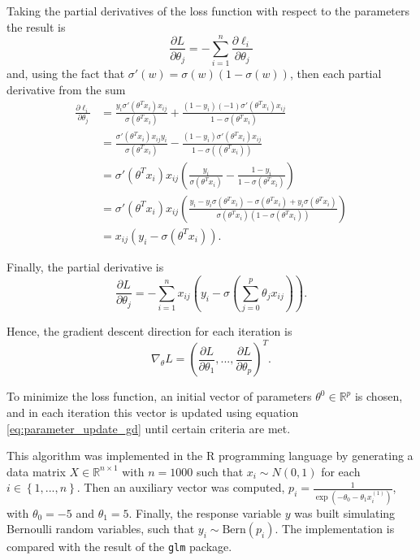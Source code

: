 Taking the partial derivatives of the loss function with respect to the parameters the result is
\begin{equation}
  \frac{\partial L}{\partial \theta_j} = - \sum_{i = 1}^n { \frac{\partial \ell_i}{\partial \theta_j} }
\end{equation}
and, using the fact that $\sigma'(w) = \sigma(w)(1-\sigma(w))$, then each partial derivative from the sum
\begin{equation}
  \begin{split}
    \frac{\partial \ell_i}{\partial \theta_j} & =
    \frac{y_i \sigma'(\theta^T x_i) x_{ij} }  {\sigma(\theta^T x_i)} + \frac{(1 - y_i) (-1) \sigma'(\theta^T x_i) x_{ij}} {1 - \sigma(\theta^T x_i)} \\
    & = \frac{\sigma'(\theta^T x_i) x_{ij} y_i}{\sigma(\theta^T x_i)} - \frac{(1 - y_i) \sigma'(\theta^T x_i) x_{ij}}{1 - \sigma((\theta^T x_i))} \\
    & = \sigma'(\theta^T x_i) x_{ij} \left(\frac{y_i}{\sigma(\theta^T x_i)} - \frac{1-y_i}{1-\sigma(\theta^T x_i)} \right) \\
    & = \sigma'(\theta^T x_i) x_{ij} \left(\frac{y_i - y_i \sigma(\theta^T x_i) -
    \sigma(\theta^T x_i) + y_i \sigma(\theta^T x_i)}{\sigma(\theta^T x_i)(1-\sigma(\theta^T x_i))} \right) \\
    & = x_{ij}(y_i - \sigma(\theta^T x_i)).
  \end{split}
\end{equation}

Finally, the partial derivative is
\begin{equation}
  \frac{\partial L}{\partial \theta_j} = - \sum_{i = 1}^n { x_{ij}(y_i - \sigma(\sum_{j=0}^{p}{\theta_j x_{ij}})) }.
\end{equation}

Hence, the gradient descent direction for each iteration is
\begin{equation}
  \nabla_{\theta} L = \left( \frac{\partial L}{\partial \theta_1}, ..., \frac{\partial L}{\partial \theta_p} \right)^T.
\end{equation}

To minimize the loss function, an initial vector of parameters $\theta^0 \in \mathbb{R}^p$ is chosen, and in each iteration this vector is updated using equation \eqref{eq:parameter_update_gd} until certain criteria are met.

This algorithm was implemented in the R programming language \cite{R_manual} by generating a data matrix $X \in \mathbb{R}^{n \times 1}$ with $n = 1000$ such that $x_i \sim N(0, 1)$ for each $i \in \left\{1, ..., n \right\}$.
Then an auxiliary vector was computed, $p_i = \frac{1}{\exp \left( - \theta_0 - \theta_1 x_i^{(1)} \right)}$, with $\theta_0 = -5$ and $\theta_1 = 5$. Finally, the response variable $y$ was built simulating Bernoulli random variables, such that $y_i \sim \mathrm{Bern}(p_i)$.
The implementation is compared with the result of the \texttt{glm} package.

